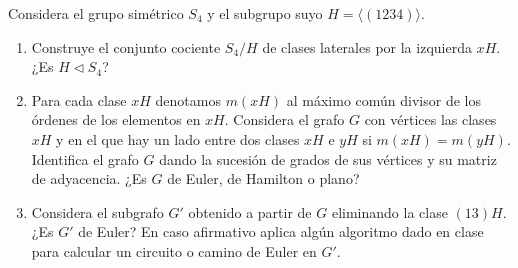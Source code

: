 \begin{ejercicio}\label{ej:1.39}
    Considera el grupo simétrico $S_4$ y el subgrupo suyo $H = \langle (1 2 3 4) \rangle$.
    \begin{enumerate}
        \item Construye el conjunto cociente $S_4/H$ de clases laterales por la izquierda $xH$. ¿Es $H \triangleleft S_4$?
        \item Para cada clase $xH$ denotamos $m(xH)$ al máximo común divisor de los órdenes de los elementos en $xH$. Considera el grafo $G$ con vértices las clases $xH$ y en el que hay un lado entre dos clases $xH$ e $yH$ si $m(xH) = m(yH)$. Identifica el grafo $G$ dando la sucesión de grados de sus vértices y su matriz de adyacencia. ¿Es $G$ de Euler, de Hamilton o plano?
        \item Considera el subgrafo $G'$ obtenido a partir de $G$ eliminando la clase $(1 3)H$. ¿Es $G'$ de Euler? En caso afirmativo aplica algún algoritmo dado en clase para calcular un circuito o camino de Euler en $G'$.
    \end{enumerate}
\end{ejercicio}


